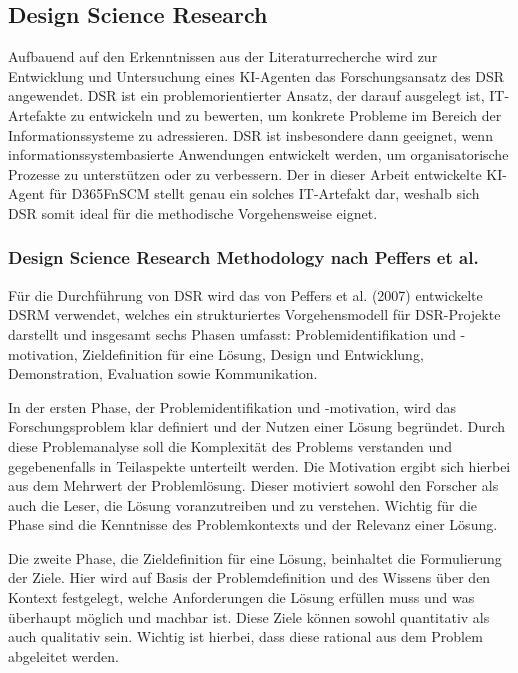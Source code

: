 \subsection{Design Science Research}
Aufbauend auf den Erkenntnissen aus der Literaturrecherche wird zur Entwicklung und Untersuchung eines \ac{KI}-Agenten das Forschungsansatz des \ac{DSR} angewendet. \ac{DSR} ist ein problemorientierter Ansatz, der darauf ausgelegt ist, IT-Artefakte zu entwickeln und zu bewerten, um konkrete Probleme im Bereich der Informationssysteme zu adressieren. \ac{DSR} ist insbesondere dann geeignet, wenn informationssystembasierte Anwendungen entwickelt werden, um organisatorische Prozesse zu unterstützen oder zu verbessern. \cite[\pagef 1ff]{hevner_design_2010}
Der in dieser Arbeit entwickelte \ac{KI}-Agent für \ac{D365FnSCM} stellt genau ein solches IT-Artefakt dar, weshalb sich \ac{DSR} somit ideal für die methodische Vorgehensweise eignet.

\subsubsection{Design Science Research Methodology nach Peffers et al.}

Für die Durchführung von \ac{DSR} wird das von Peffers et al. (2007) entwickelte \ac{DSRM} verwendet, welches ein strukturiertes Vorgehensmodell für \ac{DSR}-Projekte darstellt und insgesamt sechs Phasen umfasst: Problemidentifikation und -motivation, Zieldefinition für eine Lösung, Design und Entwicklung, Demonstration, Evaluation sowie Kommunikation. \cite[\pagef 54ff]{peffers_design_2007} 

In der ersten Phase, der Problemidentifikation und -motivation, wird das Forschungsproblem klar definiert und der Nutzen einer Lösung begründet. Durch diese Problemanalyse soll die Komplexität des Problems verstanden und gegebenenfalls in Teilaspekte unterteilt werden. Die Motivation ergibt sich hierbei aus dem Mehrwert der Problemlösung. Dieser motiviert sowohl den Forscher als auch die Leser, die Lösung voranzutreiben und zu verstehen. Wichtig für die Phase sind die Kenntnisse des Problemkontexts und der Relevanz einer Lösung. \cite[\pagef 54ff]{peffers_design_2007}

Die zweite Phase, die Zieldefinition für eine Lösung, beinhaltet die Formulierung der Ziele. Hier wird auf Basis der Problemdefinition und des Wissens über den Kontext festgelegt, welche Anforderungen die Lösung erfüllen muss und was überhaupt möglich und machbar ist. Diese Ziele können sowohl quantitativ als auch qualitativ sein. Wichtig ist hierbei, dass diese rational aus dem Problem abgeleitet werden. \cite[]{peffers_design_2007}

